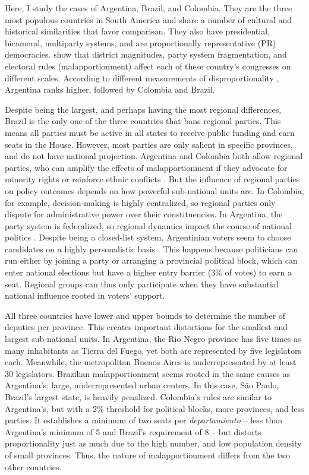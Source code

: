 \documentclass[a4paper,12pt]{article}
\begin{document}
Here, I study the cases of Argentina, Brazil, and Colombia. They are the three most populous countries in South America and share a number of cultural and historical similarities that favor comparison. They also have presidential, bicameral, multiparty systems, and are proportionally representative (PR) democracies. \citet{bunker2010explicando} show that district magnitudes, party system fragmentation, and electoral rules (malapportionment) affect each of these country's congresses on different scales. According to different measurements of disproportionality \citep{rae1967political, loosemore1971theoretical, gallagher1991proportionality}, Argentina ranks higher, followed by Colombia and Brazil.

Despite being the largest, and perhaps having the most regional differences, Brazil is the only one of the three countries that bans regional parties. This means all parties must be active in all states to receive public funding and earn seats in the House. However, most parties are only salient in specific provinces, and do not have national projection. Argentina and Colombia both allow regional parties, who can amplify the effects of malapportionment if they advocate for minority rights or reinforce ethnic conflicts \citep{brancati2008origins}. But the influence of regional parties on policy outcomes depends on how powerful sub-national units are. In Colombia, for example, decision-making is highly centralized, so regional parties only dispute for administrative power over their constituencies. In Argentina, the party system is federalized, so regional dynamics impact the course of national politics \citep{gibson2010federalized}. Despite being a closed-list system, Argentinian voters seem to choose candidates on a highly personalistic basis \citep{mustapic2002argentina}. This happens because politicians can run either by joining a party or arranging a provincial political block, which can enter national elections but have a higher entry barrier (3\% of votes) to earn a seat. Regional groups can thus only participate when they have substantial national influence rooted in voters' support.

All three countries have lower and upper bounds to determine the number of deputies per province. This creates important distortions for the smallest and largest sub-national units. In Argentina, the Rio Negro province has five times as many inhabitants as Tierra del Fuego, yet both are represented by five legislators each. Meanwhile, the metropolitan Buenos Aires is underrepresented by at least 30 legislators. Brazilian malapportionment seems rooted in the same causes as Argentina's: large, underrepresented urban centers. In this case, São Paulo, Brazil's largest state, is heavily penalized. Colombia's rules are similar to Argentina's, but with a 2\% threshold for political blocks, more provinces, and less parties. It establishes a minimum of two seats per \textit{departamiento} -- less than Argentina's minimum of 5 and Brazil's requirement of 8 -- but distorts proportionality just as much due to the high number, and low population density of small provinces. Thus, the nature of malapportionment differs from the two other countries. 
\end{document}
